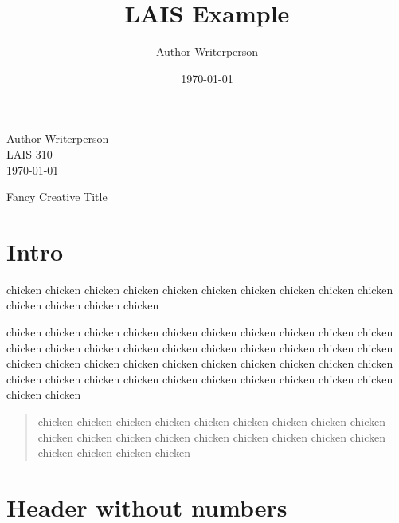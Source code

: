 \documentclass[]{article}
\title{LAIS Example}
\author{Author Writerperson}
\date{\today}
\begin{document}
\maketitle


\newpage

\singlespacing
\begin{flushright}
Author Writerperson \\
LAIS 310 \\
\today
\end{flushright}

\begin{center}
\Huge
Fancy Creative Title

\end{center}

\setcounter{page}{1}

\section{Intro}

\doublespacing

chicken chicken chicken chicken chicken chicken chicken chicken chicken chicken
chicken chicken chicken chicken

chicken chicken chicken chicken chicken chicken chicken chicken chicken chicken
chicken chicken chicken chicken chicken chicken chicken chicken chicken chicken
chicken chicken chicken chicken chicken chicken chicken chicken chicken chicken
chicken chicken chicken chicken chicken chicken chicken chicken chicken chicken
chicken chicken

\begin{quote}

    chicken chicken chicken chicken chicken chicken chicken chicken chicken
    chicken chicken chicken chicken chicken chicken chicken chicken chicken
    chicken chicken chicken chicken 

\end{quote}

\section*{Header without numbers}
\end{document}
